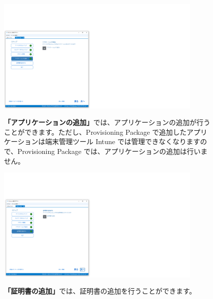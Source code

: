 \begin{figure}[hp]
    \begin{minipage}{0.6\textwidth}
        \vspace{-1cm}
        \includegraphics[width=10cm]{figures/MakeProvisioningPackage-14}
    \end{minipage}
    \begin{minipage}{0.4\textwidth}
        \textbf{「アプリケーションの追加」}では、アプリケーションの追加が行うことができます。ただし、Provisioning Package で追加したアプリケーションは端末管理ツール Intune では管理できなくなりますので、Provisioning Package では、アプリケーションの追加は行いません。
    \end{minipage}
\end{figure}

\begin{figure}[hp]
    \begin{minipage}{0.6\textwidth}
        \vspace{-1cm}
        \includegraphics[width=10cm]{figures/MakeProvisioningPackage-15}
    \end{minipage}
    \begin{minipage}{0.4\textwidth}
        \textbf{「証明書の追加」}では、証明書の追加を行うことができます。
    \end{minipage}
\end{figure}

